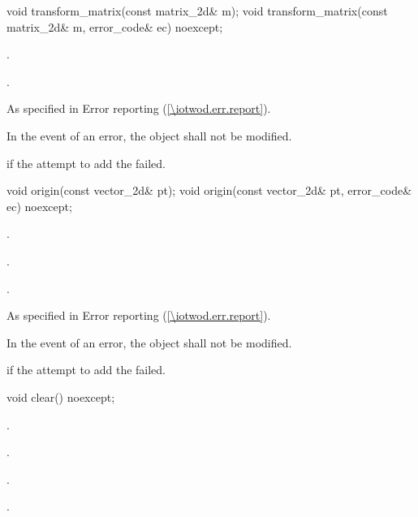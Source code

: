 \begin{itemdecl}
    void transform_matrix(const matrix_2d& m);
    void transform_matrix(const matrix_2d& m, error_code& ec) noexcept;
\end{itemdecl}
\begin{itemdescr}
	\pnum
	\effects
	.
	
	\pnum
	.
	
	\pnum
	\throws
	As specified in Error reporting (\ref{\iotwod.err.report}).

	\pnum
	\remarks
	In the event of an error, the object shall not be modified.

	\pnum
	\errors
	 if the attempt to add the  failed.
\end{itemdescr}

\begin{itemdecl}
    void origin(const vector_2d& pt);
    void origin(const vector_2d& pt, error_code& ec) noexcept;
\end{itemdecl}
\begin{itemdescr}
	\pnum
	\effects
	.
	
	\pnum
	.
	
	\pnum
	\postconditions
	.
	
	\pnum
	\throws
	As specified in Error reporting (\ref{\iotwod.err.report}).

	\pnum
	\remarks
	In the event of an error, the object shall not be modified.

	\pnum
	\errors
	 if the attempt to add the  failed.
\end{itemdescr}

\begin{itemdecl}
    void clear() noexcept;
\end{itemdecl}
\begin{itemdescr}
	\pnum
	\postconditions
	.
	
	\pnum
	.
	
	\pnum
	.
	
	\pnum
	.
\end{itemdescr}

